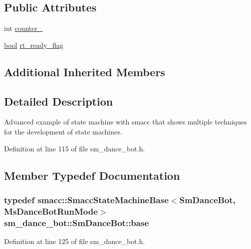 \subsection*{Public Attributes}
\begin{DoxyCompactItemize}
\item 
int \hyperlink{structsm__dance__bot_1_1SmDanceBot_ab3b8db557ce94d34c60b291911eb140c}{counter\+\_}
\item 
\hyperlink{classbool}{bool} \hyperlink{structsm__dance__bot_1_1SmDanceBot_a0f0587a13670ad8925555cd8f6cb6b2d}{rt\+\_\+ready\+\_\+flag}
\end{DoxyCompactItemize}
\subsection*{Additional Inherited Members}


\subsection{Detailed Description}
Advanced example of state machine with smacc that shows multiple techniques for the development of state machines. 

Definition at line 115 of file sm\+\_\+dance\+\_\+bot.\+h.



\subsection{Member Typedef Documentation}
\subsubsection[{\texorpdfstring{base}{base}}]{\setlength{\rightskip}{0pt plus 5cm}typedef {\bf smacc\+::\+Smacc\+State\+Machine\+Base}$<${\bf Sm\+Dance\+Bot}, {\bf Ms\+Dance\+Bot\+Run\+Mode}$>$ {\bf sm\+\_\+dance\+\_\+bot\+::\+Sm\+Dance\+Bot\+::base}}\hypertarget{structsm__dance__bot_1_1SmDanceBot_a33b03e67fc72482c067af48e1f9d95a3}{}\label{structsm__dance__bot_1_1SmDanceBot_a33b03e67fc72482c067af48e1f9d95a3}


Definition at line 125 of file sm\+\_\+dance\+\_\+bot.\+h.

